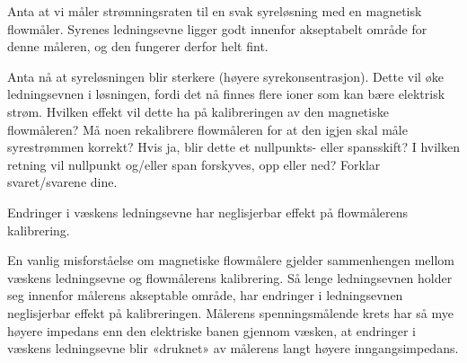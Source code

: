 

Anta at vi måler strømningsraten til en svak syreløsning med en magnetisk flowmåler. Syrenes ledningsevne ligger godt innenfor akseptabelt område for denne måleren, og den fungerer derfor helt fint.

Anta nå at syreløsningen blir sterkere (høyere syrekonsentrasjon). Dette vil øke ledningsevnen i løsningen, fordi det nå finnes flere ioner som kan bære elektrisk strøm. Hvilken effekt vil dette ha på kalibreringen av den magnetiske flowmåleren? Må noen rekalibrere flowmåleren for at den igjen skal måle syrestrømmen korrekt? Hvis ja, blir dette et nullpunkts- eller spansskift? I hvilken retning vil nullpunkt og/eller span forskyves, opp eller ned? Forklar svaret/svarene dine.







Endringer i væskens ledningsevne har neglisjerbar effekt på flowmålerens kalibrering.

\vskip 10pt

En vanlig misforståelse om magnetiske flowmålere gjelder sammenhengen mellom væskens ledningsevne og flowmålerens kalibrering. Så lenge ledningsevnen holder seg innenfor målerens akseptable område, har endringer i ledningsevnen neglisjerbar effekt på kalibreringen. Målerens spenningsmålende krets har så mye høyere impedans enn den elektriske banen gjennom væsken, at endringer i væskens ledningsevne blir «druknet» av målerens langt høyere inngangsimpedans.











